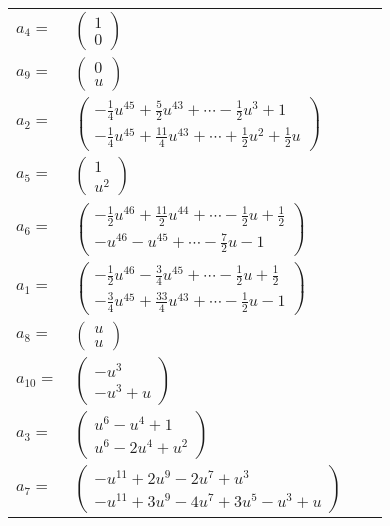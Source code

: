 \documentclass[1p]{elsarticle_modified}
\theoremstyle{definition}
\begin{document}
\begin{tabular}{m{7pt} m{180pt} m{7pt} m{180pt} }
\flushright $a_{4}=$&$\begin{pmatrix}1\\0\end{pmatrix}$ \\
\flushright $a_{9}=$&$\begin{pmatrix}0\\u\end{pmatrix}$ \\
\flushright $a_{2}=$&$\begin{pmatrix}-\frac{1}{4} u^{45}+\frac{5}{2} u^{43}+\cdots-\frac{1}{2} u^3+1\\-\frac{1}{4} u^{45}+\frac{11}{4} u^{43}+\cdots+\frac{1}{2} u^2+\frac{1}{2} u\end{pmatrix}$ \\
\flushright $a_{5}=$&$\begin{pmatrix}1\\u^2\end{pmatrix}$ \\
\flushright $a_{6}=$&$\begin{pmatrix}-\frac{1}{2} u^{46}+\frac{11}{2} u^{44}+\cdots-\frac{1}{2} u+\frac{1}{2}\\- u^{46}- u^{45}+\cdots-\frac{7}{2} u-1\end{pmatrix}$ \\
\flushright $a_{1}=$&$\begin{pmatrix}-\frac{1}{2} u^{46}-\frac{3}{4} u^{45}+\cdots-\frac{1}{2} u+\frac{1}{2}\\-\frac{3}{4} u^{45}+\frac{33}{4} u^{43}+\cdots-\frac{1}{2} u-1\end{pmatrix}$ \\
\flushright $a_{8}=$&$\begin{pmatrix}u\\u\end{pmatrix}$ \\
\flushright $a_{10}=$&$\begin{pmatrix}- u^3\\- u^3+u\end{pmatrix}$ \\
\flushright $a_{3}=$&$\begin{pmatrix}u^6- u^4+1\\u^6-2 u^4+u^2\end{pmatrix}$ \\
\flushright $a_{7}=$&$\begin{pmatrix}- u^{11}+2 u^9-2 u^7+u^3\\- u^{11}+3 u^9-4 u^7+3 u^5- u^3+u\end{pmatrix}$ \\

\end{tabular}
\end{document}
